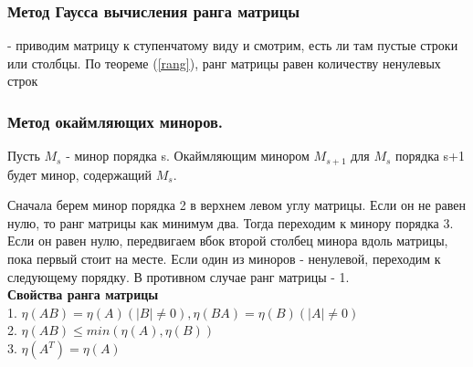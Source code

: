 \subsubsection{Метод Гаусса вычисления ранга матрицы} - приводим матрицу к 
ступенчатому виду и смотрим, есть ли там пустые строки или столбцы. По теореме 
(\ref{rang}), ранг матрицы равен количеству ненулевых строк
\subsubsection{Метод окаймляющих миноров.}
\begin{defin}
Пусть $M_s$ - минор порядка s. Окаймляющим минором $M_{s+1}$ для $M_s$ порядка
s+1 будет минор, содержащий $M_s$.
\end{defin}
Сначала берем минор порядка 2 в верхнем левом углу матрицы. Если он не равен 
нулю, то ранг матрицы как минимум два. Тогда переходим к минору порядка 3. 
\\Если он равен нулю, передвигаем вбок второй столбец минора вдоль матрицы, 
пока первый стоит на месте. Если один из миноров - ненулевой, переходим к 
следующему порядку. В противном случае ранг матрицы - 1.  \\
\textbf{Свойства ранга матрицы}\\
1. $\eta(AB)=\eta(A)  (|B|\ne0), \eta(BA)=\eta(B)  (|A|\ne0)$\\
2. $\eta(AB)\leqslant min(\eta(A),\eta(B))$\\
3. $\eta(A^T)=\eta(A)$

